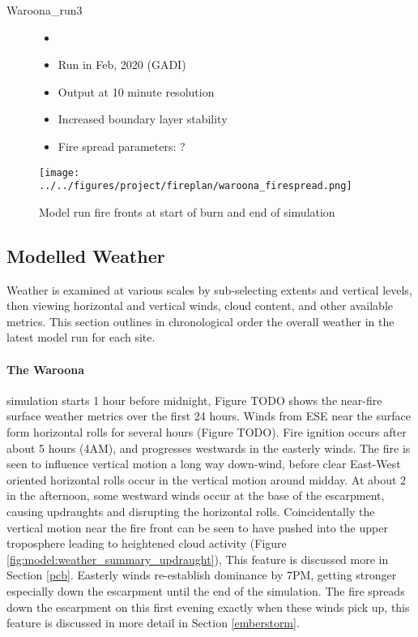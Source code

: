 \begin{description}
      \item [Waroona\_run3]
      \begin{itemize}
        \item []
        \item Run in Feb, 2020 (GADI)
        \item Output at 10 minute resolution
        \item Increased boundary layer stability
        \item Fire spread parameters: ?
      \end{itemize}
    \end{description}
    
    \begin{figure}
      \texttt{[image: ../../figures/project/fireplan/waroona\_firespread.png]}
      \caption{Model run fire fronts at start of burn and end of simulation}
      \label{fig:model:firespread_waroona}
    \end{figure}
    
    
  \subsection{Modelled Weather}
    \label{model:weather_summary}
    
    Weather is examined at various scales by sub-selecting extents and vertical levels, then viewing horizontal and vertical winds, cloud content, and other available metrics. This section outlines in chronological order the overall weather in the latest model run for each site.
    
    \paragraph{The Waroona} simulation starts 1 hour before midnight, Figure TODO shows the near-fire surface weather metrics over the first 24 hours.
    Winds from ESE near the surface form horizontal rolls for several hours (Figure TODO). Fire ignition occurs after about 5 hours (4AM), and progresses westwards in the easterly winds. 
    The fire is seen to influence vertical motion a long way down-wind, before clear East-West oriented horizontal rolls occur in the vertical motion around midday. 
    At about 2 in the afternoon, some westward winds occur at the base of the escarpment, causing updraughts and disrupting the horizontal rolls.
    Coincidentally the vertical motion near the fire front can be seen to have pushed into the upper troposphere leading to heightened cloud activity (Figure \ref{fig:model:weather_summary_updraught}), This feature is discussed more in Section \ref{pcb}.
    Easterly winds re-establish dominance by 7PM, getting stronger especially down the escarpment until the end of the simulation.
    The fire spreads down the escarpment on this first evening exactly when these winds pick up, this feature is discussed in more detail in Section \ref{emberstorm}.
    
